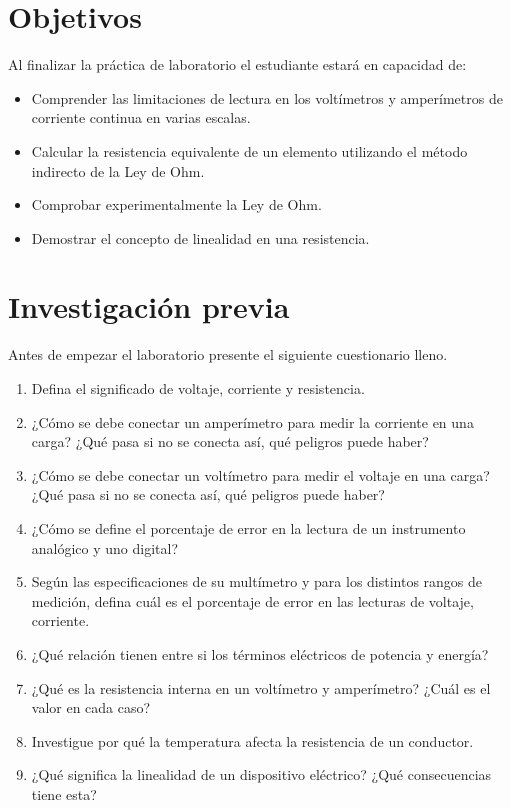 \documentclass{report}
\newcommand{\obj}{Objetivos}
\newcommand{\inv}{Investigación previa}
\newcommand{\antesde}{Antes de empezar el laboratorio presente el siguiente cuestionario lleno.}
\begin{document}
\section{\obj}
Al finalizar la práctica de laboratorio el estudiante estará en capacidad de:
\begin{itemize}
\item Comprender las limitaciones de lectura en los voltímetros y amperímetros de corriente continua en varias escalas.
\item Calcular la resistencia equivalente de un elemento utilizando el método indirecto de la Ley de Ohm.
\item	Comprobar experimentalmente la Ley de Ohm.
\item	Demostrar el concepto de linealidad en una resistencia.
\end{itemize}

\section{\inv}
\antesde
\begin{enumerate}
\item	Defina el significado de voltaje, corriente y resistencia.
\item	¿Cómo se debe conectar un amperímetro para medir la corriente en una carga? ¿Qué pasa si no se conecta así, qué peligros puede haber?
\item	¿Cómo se debe conectar un voltímetro para medir el voltaje en una carga? ¿Qué pasa si no se conecta así, qué peligros puede haber?
\item	¿Cómo se define el porcentaje de error en la lectura de un instrumento analógico y uno digital?
\item	Según las especificaciones de su multímetro y para los distintos rangos de medición, defina cuál es el porcentaje de error en las lecturas de voltaje, corriente.
\item	¿Qué relación tienen entre si los términos eléctricos de potencia y energía?
\item	¿Qué es la resistencia interna en un voltímetro y amperímetro? ¿Cuál es el valor en cada caso?
\item	Investigue por qué la temperatura afecta la resistencia de un conductor.
\item	¿Qué significa la linealidad de un dispositivo eléctrico? ¿Qué consecuencias tiene esta?
\end{enumerate}
\end{document}
